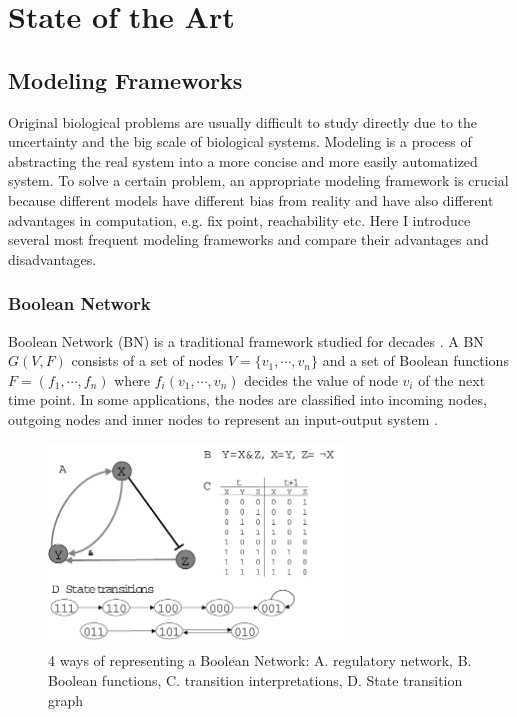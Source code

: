 \chapter{State of the Art}

\section{Modeling Frameworks}
Original biological problems are usually difficult to study directly due to the uncertainty and the big scale of biological systems. 
Modeling is a process of abstracting the real system into a more concise and more easily automatized system.
To solve a certain problem, an appropriate modeling framework is crucial because different models have different bias from reality and have also different advantages in computation, e.g. fix point, reachability etc.
Here I introduce several most frequent modeling frameworks and compare their advantages and disadvantages.

\subsection{Boolean Network}
Boolean Network (BN) is a traditional framework studied for decades \cite{kauffman1969}.
A BN $G(V,F)$ consists of a set of nodes $V=\{v_1,\cdots,v_n\}$ and a set of Boolean functions $F=(f_1,\cdots,f_n)$ where $f_i(v_1,\cdots,v_n)$ decides the value of node $v_i$ of the next time point.
In some applications, the nodes are classified into incoming nodes, outgoing nodes and inner nodes to represent an input-output system \cite{akutsu2007control}.
\begin{figure}
    \centering
    \includegraphics[width=0.7\textwidth]{BooleanNetwork.png}
    \caption[Boolean Network]{4 ways of representing a Boolean Network: A. regulatory network, B. Boolean functions, C. transition interpretations, D. State transition graph}
    \label{fig:booleannetwork}
\end{figure}

